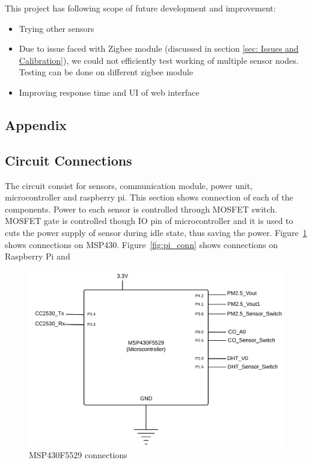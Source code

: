 \documentclass[a4paper,12pt]{article}
\begin{document}
This project has following scope of future development and improvement:
\begin{itemize}
\item Trying other sensors
\item Due to issue faced with Zigbee module (discussed in section \ref{sec: Issues and Calibration}), we could not efficiently test working of multiple sensor nodes. Testing can be done on different zigbee module
\item Improving response time and UI of web interface

\end{itemize}



\newpage


\newpage

\appendix
\begin{center}
\section{Appendix}
\end{center}

\subsection{Circuit Connections}
The circuit consist for sensors, communication module, power unit, microcontroller and raspberry pi. This section shows connection of each of the components. Power to each sensor is controlled through MOSFET switch. MOSFET gate is controlled though IO pin of microcontroller and it is used to cuts the power supply of sensor during idle state, thus saving the power. Figure~\ref{fig:msp430_conn} shows connections on MSP430. Figure~\ref{fig:pi_conn} shows connections on Raspberry Pi and 

\begin{figure} [!ht]
	\centering
	\includegraphics[scale=0.25]{msp430.png}
	\caption{MSP430F5529 connections}
	\label{fig:msp430_conn}
\end{figure}
\end{document}
